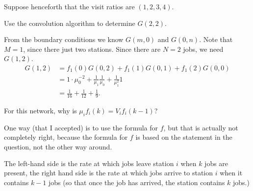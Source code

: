 Suppose henceforth that the visit ratios are $(1,2,3,4)$. 

\begin{exercise}[201706]
 Use the convolution algorithm to determine $G(2,2)$.
\begin{solution}
 From the boundary conditions we know $G(m, 0)$ and $G(0,n)$. Note
 that $M=1$, since there just two stations. Since there are $N=2$
 jobs, we need $G(1,2)$. 
 \begin{equation*}
 \begin{split}
 G(1,2) &= f_1(0) G(0, 2) + f_1(1) G(0, 1) + f_1(2) G(0,0) \\
 &= 1\cdot \mu_0^{-2} + \frac1{\mu_1} \frac{1}{\mu_0} + \frac{1}{\mu_1^2} 1 \\
 &= \frac 1{16} + \frac1{12} + \frac{1}{9}.
 \end{split}
 \end{equation*}
\end{solution}
\end{exercise}

\begin{exercise}[201706]
For this network, why is $\mu_i f_i(k) = V_i f_i(k-1)$? 
\begin{solution}
 One way (that I accepted) is to use the formula for $f$, but that is actually not completely right, because the formula for $f$ is based on the statement in the question, not the other way around. 

The left-hand side is the rate at which jobs leave station $i$ when $k$ jobs are present, the right hand side is the rate at which jobs arrive to station $i$ when it contains $k-1$ jobs (so that once the job has arrived, the station contains $k$ jobs.)
\end{solution}
\end{exercise}



